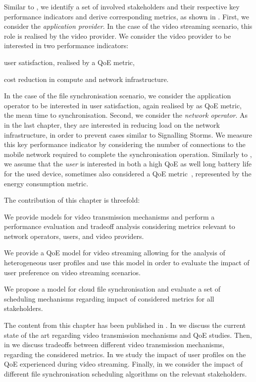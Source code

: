 Similar to , we identify a set of involved stakeholders and their respective key performance indicators and derive corresponding metrics, as shown in .
First, we consider the \emph{application provider}. 
In the case of the video streaming scenario, this role is realised by the video provider.
We consider the video provider to be interested in two performance indicators: 
\begin{enumerate*}
\item user satisfaction, realised by a \gls{QoE} metric,
\item cost reduction in compute and network infrastructure.
\end{enumerate*}
In the case of the file synchronisation scenario, we consider the application operator to be interested in user satisfaction, again realised by as \gls{QoE} metric, the mean time to synchronisation.
Second, we consider the \emph{network operator}.
As in the last chapter, they are interested in reducing load on the network infrastructure, in order to prevent cases similar to Signalling Storms.
We measure this key performance indicator by considering the number of connections to the mobile network required to complete the synchronisation operation.
Similarly to , we assume that the \emph{user} is interested in both a high \gls{QoE} as well long battery life for the used device, sometimes also considered a \gls{QoE} metric~\cite{Ickin2012}, represented by the energy consumption metric. 

The contribution of this chapter is threefold:
\begin{enumerate*}
\item We provide models for video transmission mechanisms and perform a performance evaluation and tradeoff analysis considering metrics relevant to network operators, users, and video providers.
\item We provide a \gls{QoE} model for video streaming allowing for the analysis of heterogeneous user profiles and use this model in order to evaluate the impact of user preference on video streaming scenarios.
\item We propose a model for cloud file synchronisation and evaluate a set of scheduling mechanisms regarding impact of considered metrics for all stakeholders.
\end{enumerate*}

The content from this chapter has been published in \cite{Schwartz2013b, Hossfeld2015, Schwartz2014a}.
In  we discuss the current state of the art regarding video transmission mechanisms and \gls{QoE} studies.
Then, in  we discuss tradeoffs between different video transmission mechanisms, regarding the considered metrics.
In  we study the impact of user profiles on the \gls{QoE} experienced during video streaming.
Finally, in  we consider the impact of different file synchronisation scheduling algorithms on the relevant stakeholders.





